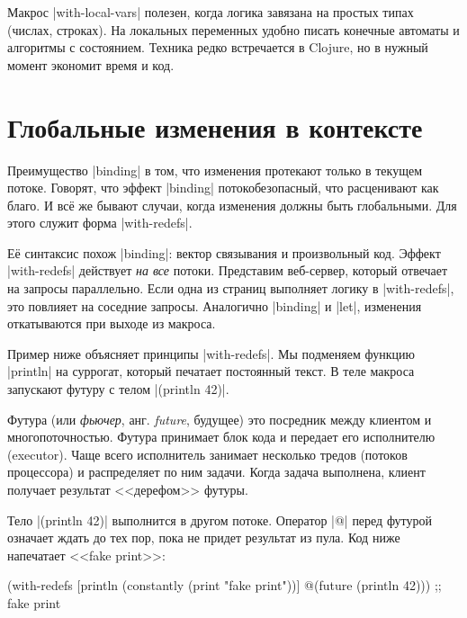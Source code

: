 Макрос \spverb|with-local-vars| полезен, когда логика завязана на простых типах
(числах, строках). На локальных переменных удобно писать конечные автоматы и
алгоритмы с состоянием. Техника редко встречается в Clojure, но в нужный момент
экономит время и код.

\section{Глобальные изменения в контексте}


\label{with-redefs}

Преимущество \spverb|binding| в том, что изменения протекают только в текущем
потоке. Говорят, что эффект \spverb|binding| потокобезопасный, что расценивают
как благо. И вс\"{е} же бывают случаи, когда изменения должны быть глобальными. Для
этого служит форма \spverb|with-redefs|.

Е\"{е} синтаксис похож \spverb|binding|: вектор связывания и произвольный
код. Эффект \spverb|with-redefs| действует \emph{на все} потоки. Представим
веб-сервер, который отвечает на запросы параллельно. Если одна из страниц
выполняет логику в \spverb|with-redefs|, это повлияет на соседние
запросы. Аналогично \spverb|binding| и \spverb|let|, изменения откатываются при
выходе из макроса.

Пример ниже объясняет принципы \spverb|with-redefs|. Мы подменяем функцию
\spverb|println| на суррогат, который печатает постоянный текст. В теле макроса
запускают футуру с телом \spverb|(println 42)|.


Футура (или \emph{фьючер}, анг. \emph{future}, будущее) это посредник между
клиентом и многопоточностью. Футура принимает блок кода и передает его
исполнителю (executor). Чаще всего исполнитель занимает несколько тредов
(потоков процессора) и распределяет по ним задачи. Когда задача выполнена,
клиент получает результат <<дерефом>> футуры.

Тело \spverb|(println 42)| выполнится в другом потоке. Оператор \spverb|@|
перед футурой означает ждать до тех пор, пока не придет результат из пула. Код
ниже напечатает <<fake print>>:


\begin{english}
  \begin{clojure}
(with-redefs
  [println (constantly (print "fake print"))]
  @(future (println 42)))
;; fake print
  \end{clojure}
\end{english}

